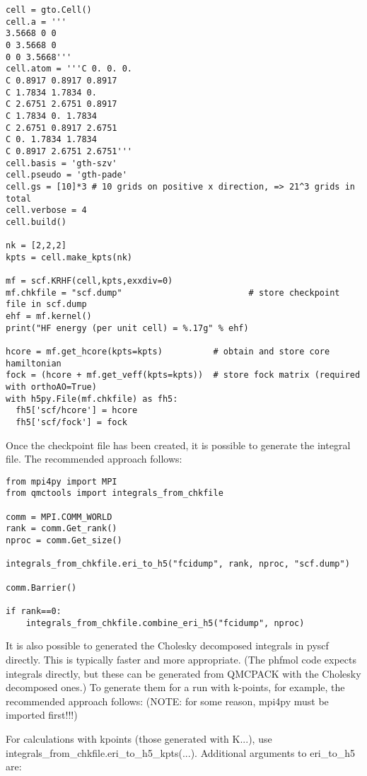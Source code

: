 \begin{itemize}
\begin{lstlisting}[style=Python,caption=The following is an example PySCF input file for calculations with k-points.]
cell = gto.Cell()
cell.a = '''
3.5668 0 0
0 3.5668 0
0 0 3.5668'''
cell.atom = '''C 0. 0. 0. 
C 0.8917 0.8917 0.8917
C 1.7834 1.7834 0. 
C 2.6751 2.6751 0.8917
C 1.7834 0. 1.7834
C 2.6751 0.8917 2.6751
C 0. 1.7834 1.7834
C 0.8917 2.6751 2.6751'''
cell.basis = 'gth-szv'
cell.pseudo = 'gth-pade'
cell.gs = [10]*3 # 10 grids on positive x direction, => 21^3 grids in total
cell.verbose = 4
cell.build()

nk = [2,2,2]
kpts = cell.make_kpts(nk) 

mf = scf.KRHF(cell,kpts,exxdiv=0)
mf.chkfile = "scf.dump"                         # store checkpoint file in scf.dump
ehf = mf.kernel()
print("HF energy (per unit cell) = %.17g" % ehf)

hcore = mf.get_hcore(kpts=kpts)          # obtain and store core hamiltonian
fock = (hcore + mf.get_veff(kpts=kpts))  # store fock matrix (required with orthoAO=True)
with h5py.File(mf.chkfile) as fh5:
  fh5['scf/hcore'] = hcore
  fh5['scf/fock'] = fock
\end{lstlisting}
\end{itemize}

Once the checkpoint file has been created, it is possible to generate the integral file. The recommended approach follows:

\begin{lstlisting}[style=Python,caption=The following is an example input file for calculating the integrals.]
from mpi4py import MPI
from qmctools import integrals_from_chkfile

comm = MPI.COMM_WORLD
rank = comm.Get_rank()
nproc = comm.Get_size()

integrals_from_chkfile.eri_to_h5("fcidump", rank, nproc, "scf.dump")    

comm.Barrier()

if rank==0:
    integrals_from_chkfile.combine_eri_h5("fcidump", nproc)
\end{lstlisting}

It is also possible to generated the Cholesky decomposed integrals in pyscf directly. This is typically faster and more appropriate. (The phfmol code expects integrals directly, but these can be generated from QMCPACK with the Cholesky decomposed ones.) To generate them for a run with k-points, for example, the recommended approach follows: (NOTE: for some reason, mpi4py must be imported first!!!)

For calculations with kpoints (those generated with K...), use integrals\_from\_chkfile.eri\_to\_h5\_kpts(...).
Additional arguments to eri\_to\_h5 are:

